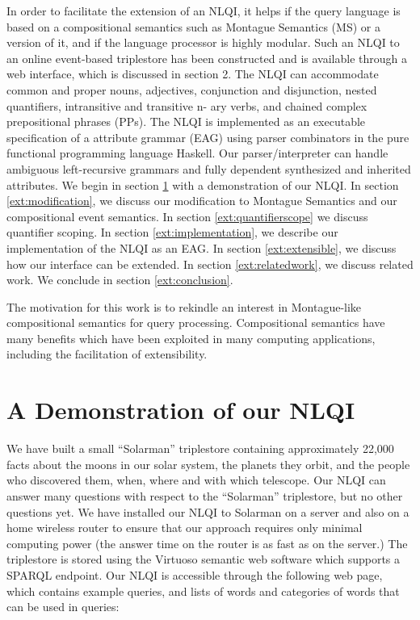 \documentclass[../main.tex]{subfiles}
\begin{document}
\begin{refsection}
In order to facilitate the extension of an NLQI, it helps if the query language is based on a compositional
semantics such as Montague Semantics (MS) \cite{Dowty:wall} or a version of it, and if the language processor is highly
modular. Such an NLQI to an online event-based triplestore has been constructed and is available
through a web interface, which is discussed in section 2. The NLQI can accommodate common and
proper nouns, adjectives, conjunction and disjunction, nested quantifiers, intransitive and transitive n-
ary verbs, and chained complex prepositional phrases (PPs). The NLQI is implemented as an executable
specification of a attribute grammar (EAG) using parser combinators in the pure functional programming
language Haskell.
Our parser/interpreter can handle ambiguous left-recursive grammars and fully dependent synthesized
and inherited attributes.
We begin in section \ref{ext:demonstration} with a demonstration of our NLQI. In section \ref{ext:modification}, we discuss our modification to
Montague Semantics and our compositional event semantics. In section \ref{ext:quantifierscope} we discuss quantifier scoping. In section \ref{ext:implementation}, we describe our implementation
of the NLQI as an EAG. In section \ref{ext:extensible}, we discuss how our interface can be extended. In section \ref{ext:relatedwork}, we discuss related work. We conclude in section \ref{ext:conclusion}.

The motivation for this work is to rekindle an interest in Montague-like compositional semantics for query processing. Compositional semantics have many benefits which have been exploited in many computing applications, including the facilitation of extensibility.

\section{A Demonstration of our NLQI}
\label{ext:demonstration}
We have built a small ``Solarman'' triplestore containing approximately 22,000 facts about the moons in
our solar system, the planets they orbit, and the people who discovered them, when, where and with
which telescope. Our NLQI can answer many questions with respect to the ``Solarman'' triplestore, but no other questions yet. We
have installed our NLQI to Solarman on a server and also on a home wireless router to ensure that our
approach requires only minimal computing power (the answer time on the router is as fast as on the
server.) The triplestore is stored using the Virtuoso semantic web software which supports a SPARQL
endpoint. Our NLQI is accessible through the following web page, which contains example queries, and
lists of words and categories of words that can be used in queries:


\end{refsection}
\end{document}
